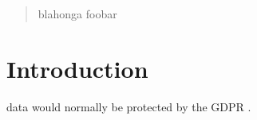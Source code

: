 \documentclass[11pt,twoside]{article}
\begin{document}
\begin{abstract}
  \noindent blahonga foobar 
\end{abstract}

\section{Introduction}
 data  would normally be protected by the GDPR \cite{gdpr}.
\end{document}
